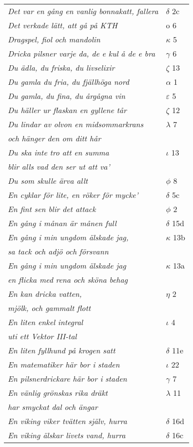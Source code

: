 \documentclass[a6paper,10pt]{article}
\begin{document}
\newpage
\begin{table}[!h]
\begin{tabular}{l l}
\textit{Det var en gång en vanlig bonnakatt, fallera}	&$\delta$ 2c\\
\textit{Det verkade lätt, att gå på KTH}     &o 6\\
\textit{Dragspel, fiol och mandolin}	&$\kappa$ 5\\
\textit{Dricka pilsner varje da, de e kul å de e bra}	&$\gamma$ 6\\
\textit{Du ädla, du friska, du livselixir}	&$\zeta$ 13\\
\textit{Du gamla du fria, du fjällhöga nord}	&$\alpha$ 1\\
\textit{Du gamla, du fina, du årgågna vin}	&$\varepsilon$ 5\\
\textit{Du häller ur flaskan en gyllene tår}	&$\zeta$ 12\\
\textit{Du lindar av olvon en midsommarkrans}	&$\lambda$ 7\\
\textit{och hänger den om ditt hår} &\\
\textit{Du ska inte tro att en summa}	&$\iota$ 13\\
\textit{blir alls vad den ser ut att va'} &\\
\textit{Du som skulle ärva allt} &$\phi$ 8\\
\textit{En cyklar för lite, en röker för mycke'}	&$\delta$ 5c\\
\textit{En fint sen blir det attack} &$\phi$ 2\\
\textit{En gång i månan är månen full}	&$\delta$ 15d\\
\textit{En gång i min ungdom älskade jag,}	&$\kappa$ 13b\\
\textit{sa tack och adjö och försvann} &\\
\textit{En gång i min ungdom älskade jag}	&$\kappa$ 13a\\
\textit{en flicka med rena och sköna behag} &\\
\textit{En kan dricka vatten,}	&$\eta$ 2\\
\textit{mjölk, och gammalt flott} &\\
\textit{En liten enkel integral}	&$\iota$ 4\\
\textit{uti ett Vektor III-tal} &\\
\textit{En liten fyllhund på krogen satt}	&$\delta$ 11e\\
\textit{En matematiker här bor i staden} &$\iota$ 22\\
\textit{En pilsnerdrickare här bor i staden}	&$\gamma$ 7\\
\textit{En vänlig grönskas rika dräkt}	&$\lambda$ 11\\
\textit{har smyckat dal och ängar} &\\
\textit{En viking viker tvätten själv, hurra} &$\delta$ 16d\\
\textit{En viking älskar livets vand, hurra}	&$\delta$ 16c\\
\end{tabular}
\end{table}
\end{document}
